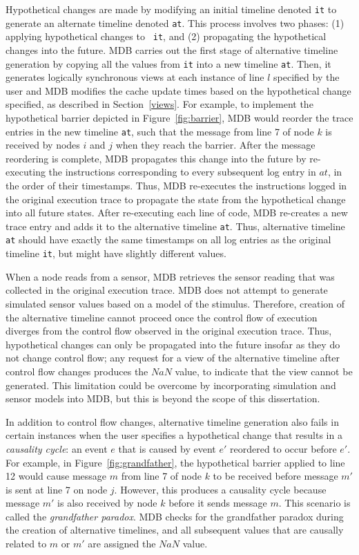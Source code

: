 Hypothetical changes are made by modifying an initial timeline denoted
{\tt it} to generate an alternate timeline denoted {\tt at}. This
process involves two phases: (1) applying hypothetical changes to {\tt
  it}, and (2) propagating the hypothetical changes into the
future. MDB carries out the first stage of alternative timeline
generation by copying all the values from {\tt it} into a new timeline
{\tt at}. Then, it generates logically synchronous views at each
instance of line $l$ specified by the user and MDB modifies the cache
update times based on the hypothetical change specified, as described
in Section~\ref{views}.  For example, to implement the hypothetical
barrier depicted in Figure~\ref{fig:barrier}, MDB would reorder the
trace entries in the new timeline {\tt at}, such that the message from
line 7 of node $k$ is received by nodes $i$ and $j$ when they reach
the barrier.  After the message reordering is complete, MDB propagates
this change into the future by re-executing the instructions
corresponding to every subsequent log entry in $at$, in the order of
their timestamps.  Thus, MDB re-executes the instructions logged in
the original execution trace to propagate the state from the
hypothetical change into all future states.  After re-executing each
line of code, MDB re-creates a new trace entry and adds it to the
alternative timeline {\tt at}.  Thus, alternative timeline {\tt at}
should have exactly the same timestamps on all log entries as the
original timeline {\tt it}, but might have slightly different values.

When a node reads from a sensor, MDB retrieves the sensor reading that
was collected in the original execution trace.  MDB does not attempt
to generate simulated sensor values based on a model of the stimulus.
Therefore, creation of the alternative timeline cannot proceed once
the control flow of execution diverges from the control flow observed
in the original execution trace.  Thus, hypothetical changes can only
be propagated into the future insofar as they do not change control
flow; any request for a view of the alternative timeline after control
flow changes produces the $NaN$ value, to indicate that the
view cannot be generated.  This limitation could be overcome by
incorporating simulation and sensor models into MDB, but this is
beyond the scope of this dissertation.

In addition to control flow changes, alternative timeline generation also fails
in certain instances when the user specifies a hypothetical change that results
in a \emph{causality cycle}: an event $e$ that is caused by event $e'$ reordered
to occur before $e'$.  For example, in Figure~\ref{fig:grandfather}, the
hypothetical barrier applied to line 12 would cause message $m$ from line 7 of
node $k$ to be received before message $m'$ is sent at line 7 on node $j$.
However, this produces a causality cycle because message $m'$ is also received
by node $k$ before it sends message $m$.  This scenario is called the
\emph{grandfather paradox}.  MDB checks for the grandfather paradox during the
creation of alternative timelines, and all subsequent values that are causally
related to $m$ or $m'$ are assigned the $NaN$ value.


